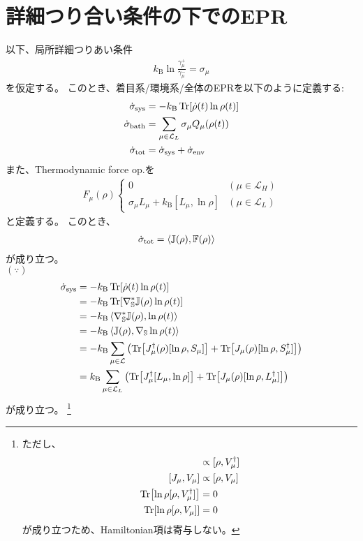 \documentclass[a4paper,11pt]{jsarticle}
\numberwithin{equation}{section}
\begin{document}
\section{詳細つり合い条件の下でのEPR}
以下、局所詳細つりあい条件
\begin{align}
    k_{\text{B}} \ln \frac{\gamma_{\mu}^{+}}{\gamma_{\mu}^{-}} = \sigma_{\mu}
\end{align}
を仮定する。
このとき、着目系/環境系/全体のEPRを以下のように定義する:
\begin{align}
    \dot{\sigma}_{\text{sys}} &= -k_{\text{B}} \Tr[ \dot{\rho}(t) \ln \rho(t)] \\
    \dot{\sigma}_{\text{bath}} &= \sum_{\mu \in \mathcal{L}_{L}} \sigma_{\mu} Q_{\mu}(\rho(t)) \\
    \dot{\sigma}_{\text{tot}} &= \dot{\sigma}_{\text{sys}} + \dot{\sigma}_{\text{env}}
\end{align}
また、Thermodynamic force op.を
\begin{align}
    F_{\mu}(\rho) 
    \begin{cases}
        0 & (\mu \in \mathcal{L}_{H}) \\
        \sigma_{\mu} L_{\mu} + k_{\text{B}}[L_{\mu}, \ln \rho] & (\mu \in \mathcal{L}_{L})
    \end{cases}
\end{align}
と定義する。
このとき、
\begin{align}
    \dot{\sigma}_{\text{tot}} &= \ev{ \mathbb{J}(\rho) , \mathbb{F}(\rho) }
\end{align}
が成り立つ。\\
$(\because)$\\
\begin{align}
    \dot{\sigma}_{\text{sys}} &= -k_{\text{B}} \Tr[ \dot{\rho}(t) \ln \rho(t)] \\
    &= -k_{\text{B}} \Tr[ \nabla^*_{\mathbb{S}} \mathbb{J}(\rho) \ln \rho(t)] \\
    &= -k_{\text{B}} \ev{ \nabla^*_{\mathbb{S}}  \mathbb{J}(\rho) , \ln \rho(t)} \\
    &= -k_{\text{B}} \ev{  \mathbb{J}(\rho) , \nabla_{\mathbb{S}} \ln \rho(t)} \\
    &= -k_{\text{B}} \sum_{\mu \in \mathcal{L}} \qty( \Tr[ J_{\mu}^{\dagger}(\rho) [\ln \rho, S_{\mu}] ] + \Tr[ J_{\mu}(\rho) [\ln \rho, S_{\mu}^{\dagger}] ]) \\
    &= k_{\text{B}} \sum_{\mu \in \mathcal{L}_{L}} \qty( \Tr[ J_{\mu}^{\dagger}[L_{\mu}, \ln \rho] ] + \Tr[ J_{\mu}(\rho) [\ln \rho, L_{\mu}^{\dagger}] ]) 
\end{align}
が成り立つ。
\footnote{ただし、
\begin{align}
    [J_{\mu}, V_{\mu}^{\dagger}] &\propto [\rho, V_{\mu}^{\dagger}]\\
    [J_{\mu}, V_{\mu}] &\propto [\rho, V_{\mu}]\\
    \Tr[\ln\rho [\rho, V_{\mu}^{\dagger}]] &= 0 \\
    \Tr[\ln\rho [\rho, V_{\mu}]] &= 0
\end{align}
が成り立つため、Hamiltonian項は寄与しない。
}
\end{document}
